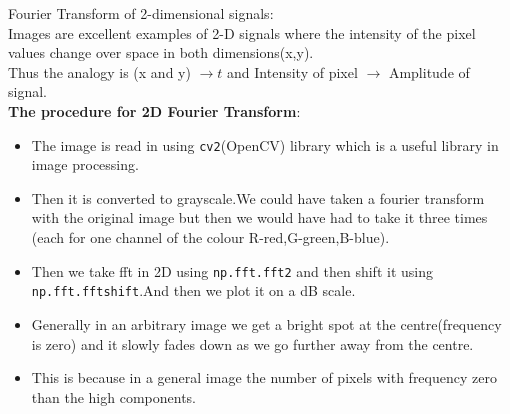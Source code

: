 \documentclass[11pt]{article}
\begin{document}
Fourier Transform of 2-dimensional signals: \\Images are excellent
examples of 2-D signals where the intensity of the pixel values change
over space in both dimensions(x,y).\\ Thus the analogy is (x and y)
\(\longrightarrow t\) and Intensity of pixel \(\longrightarrow\)
Amplitude of signal. \\\textbf{The procedure for 2D Fourier Transform}:\begin{itemize} \item The
image is read in using \texttt{cv2}(OpenCV) library which is a useful
library in image processing. \item Then it is converted to grayscale.We
could have taken a fourier transform with the original image but then we
would have had to take it three times (each for one channel of the
colour R-red,G-green,B-blue). \item Then we take fft in 2D using
\texttt{np.fft.fft2} and then shift it using
\texttt{np.fft.fftshift}.And then we plot it on a dB scale. \item Generally
in an arbitrary image we get a bright spot at the centre(frequency is
zero) and it slowly fades down as we go further away from the centre. \item
This is because in a general image the number of pixels with frequency
zero than the high components.
\end{itemize}
\end{document}
